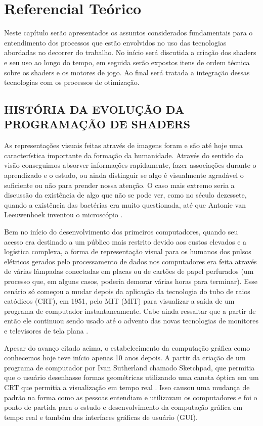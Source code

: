 \chapter{Referencial Teórico}
\label{cap:referencial-teorico}

Neste capítulo serão apresentados os assuntos considerados fundamentais para o entendimento dos processos que estão envolvidos no uso das tecnologias abordadas no decorrer do trabalho. No início será discutida a criação dos shaders e seu uso ao longo do tempo, em seguida serão expostos itens de ordem técnica sobre os shaders e os motores de jogo. Ao final será tratada a integração dessas tecnologias com os processos de otimização.

\section{HISTÓRIA DA EVOLUÇÃO DA PROGRAMAÇÃO DE SHADERS}
\label{sec:historia-do-surgimento-dos-shaders}

As representações visuais feitas através de imagens foram e são até hoje uma característica importante da formação da humanidade. Através do sentido da visão conseguimos absorver informações rapidamente, fazer associações durante o aprendizado e o estudo, ou ainda distinguir se algo é visualmente agradável o suficiente ou não para prender nossa atenção. O caso mais extremo seria a discussão da existência de algo que não se pode ver, como no século dezessete, quando a existência das bactérias era muito questionada, até que Antonie van Leeuwenhoek inventou o microscópio \cite{openGLBook}.

Bem no início do desenvolvimento dos primeiros computadores, quando seu acesso era destinado a um público mais restrito devido aos custos elevados e a logística complexa, a forma de representação visual para os humanos dos pulsos elétricos gerados pelo processamento de dados nos computadores era feita através de várias lâmpadas conectadas em placas ou de cartões de papel perfurados (um processo que, em alguns casos, poderia demorar várias horas para terminar). Esse cenário só começou a mudar depois da aplicação da tecnologia do tubo de raios catódicos (\acrshort{CRT}), em 1951, pelo MIT (\acrlong{MIT}) para visualizar a saída de um programa de computador instantaneamente. Cabe ainda ressaltar que a partir de então ele continuou sendo usado até o advento das novas tecnologias de monitores e televisores de tela plana \cite{openGLBook}.

Apesar do avanço citado acima, o estabelecimento da computação gráfica como conhecemos hoje teve início apenas 10 anos depois. A partir da criação de um programa de computador por Ivan Sutherland chamado Sketchpad, que permitia que o usuário desenhasse formas geométricas utilizando uma caneta óptica em um \acrshort{CRT} que permitia a visualização em tempo real \cite{openGLBook}. Isso causou uma mudança de padrão na forma como as pessoas entendiam e utilizavam os computadores e foi o ponto de partida para o estudo e desenvolvimento da computação gráfica em tempo real e também das interfaces gráficas de usuário (\acrshort{GUI}).


